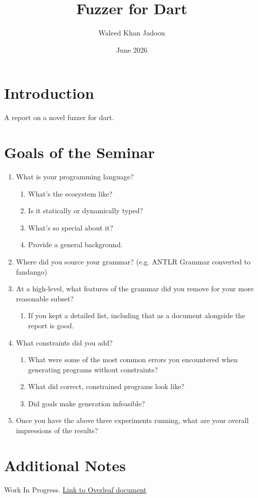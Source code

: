 \documentclass{article}
\title{Fuzzer for Dart}
\author{Waleed Khan Jadoon}
\date{June 2026}
\begin{document}
\maketitle

\section{Introduction}

A report on a novel fuzzer for dart.

\section{Goals of the Seminar}

\begin{enumerate}
    \item What is your programming language?
    \begin{enumerate}
        \item What's the ecosystem like?
        \item Is it statically or dynamically typed?
        \item What's so special about it?
        \item Provide a general background.
    \end{enumerate}

    \item Where did you source your grammar? (e.g. ANTLR Grammar converted to fandango)

    \item At a high-level, what features of the grammar did you remove for your more reasonable subset?
    \begin{enumerate}
        \item If you kept a detailed list, including that as a document alongside the report is good.
    \end{enumerate}

    \item What constraints did you add?
    \begin{enumerate}
        \item What were some of the most common errors you encountered when generating programs without constraints?
        \item What did correct, constrained programs look like?
        \item Did goals make generation infeasible?
    \end{enumerate}

    \item Once you have the above three experiments running, what are your overall impressions of the results?
\end{enumerate}

\section{Additional Notes}
Work In Progress. \href{https://www.overleaf.com/project/6a2b2e1e30622bf77d5cecee}{Link to Overleaf document}
\end{document}
